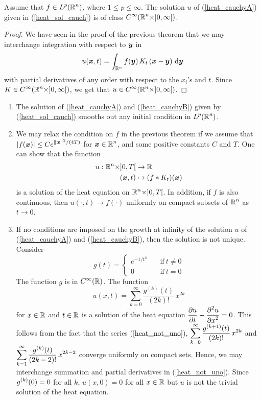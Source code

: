 \begin{prop}
Assume that $\displaystyle f \in L^p(\mathbb{R}^n)$, where $1\leq p \leq \infty$.  The
solution $u$ of (\ref{heat_cauchyA}) given in (\ref{heat_sol_cauch}) is
of class $\displaystyle C^\infty(\mathbb{R}^n\times ]0,\infty[)$.
\end{prop}

\begin{proof}
We have seen in the proof of the previous theorem that we may
interchange integration with respect to ${\bm{y}}$ in
\[
u({\bm{x}},t) = 
\int_{\mathbb{R}^n} f({\bm{y}})\,K_t\left({\bm{x}} - {\bm{y}}\right) \,\mathrm{d}{{\bm{y}}}
\]
with partial derivatives of any order with respect to the $x_i$'s
and $t$.  Since $\displaystyle K \in C^\infty(\mathbb{R}^n \times ]0,\infty[)$,
we get that $\displaystyle u \in C^\infty(\mathbb{R}^n \times ]0,\infty[)$.
\end{proof}

\begin{rmkList} \label{heat_smooth_sol}
\begin{enumerate}
\item The solution of (\ref{heat_cauchyA}) and (\ref{heat_cauchyB}) given by
(\ref{heat_sol_cauch}) smooths out any initial condition in
$\displaystyle L^p(\mathbb{R}^n)$.
\item We may relax the condition on $f$ in the previous theorem if we assume
that $\displaystyle |f({\bm{x}})| \leq C e^{\|{\bm{x}}\|^2/(4T)}$ for
$\displaystyle {\bm{x}} \in \mathbb{R}^n$, and some positive constants $C$ and
$T$.  One can show that the function
\begin{align*}
u: \mathbb{R}^n \times ]0,T[ &\rightarrow \mathbb{R} \\
({\bm{x}}, t) &\mapsto (f\ast K_t)({\bm{x}})
\end{align*}
is a solution of the heat equation on $\displaystyle \mathbb{R}^n \times ]0,T[$.  In
addition, if $f$ is also continuous, then
$u(\cdot,t) \rightarrow f(\cdot)$ uniformly on compact subsets of
$\displaystyle \mathbb{R}^n$ as $t\rightarrow 0$.
\item If no conditions are imposed on the growth at infinity of the
solution $u$ of (\ref{heat_cauchyA}) and (\ref{heat_cauchyB}), then
the solution is not unique.  Consider
\[
g(t) =
\begin{cases}
e^{-1/t^2} & \quad \text{if} \ t\neq 0 \\
0 & \quad \text{if} \ t=0
\end{cases}
\]
The function $g$ is in $\displaystyle C^\infty(\mathbb{R})$.  The function
\begin{equation} \label{heat_not_uno}
u(x,t) = \sum_{k=0}^\infty \frac{g^{(k)}(t)}{(2k)!}\,x^{2k}
\end{equation}
for $x\in \mathbb{R}$ and  $t\in \mathbb{R}$ is a solution of the heat equation
$\displaystyle \frac{\partial{u}}{\partial t} - \frac{\displaystyle \partial^{2}{u}} {\displaystyle \partial x^{2}} = 0$.  This follows
from the fact that the series (\ref{heat_not_uno}),
$\displaystyle \sum_{k=0}^\infty \frac{g^{(k+1)}(t)}{(2k)!}\,x^{2k}$
and $\displaystyle \sum_{k=1}^\infty \frac{g^{(k)}(t)}{(2k-2)!}\,x^{2k-2}$
converge uniformly on compact sets.  Hence, we may interchange
summation and partial derivatives in (\ref{heat_not_uno}). 
Since $\displaystyle g^{(k)}(0)=0$ for all $k$, $u(x,0)=0$ for all
$x\in \mathbb{R}$ but $u$ is not the trivial solution of the heat equation.
\end{enumerate}
\end{rmkList}

